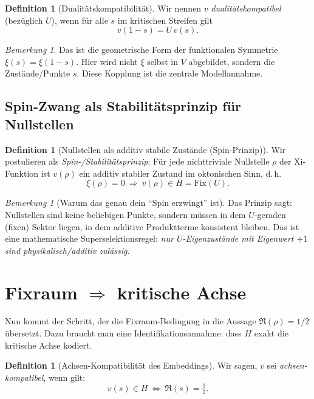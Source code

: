 \documentclass[11pt,a4paper]{article}
\theoremstyle{definition}
\newtheorem{definition}[satz]{Definition}
\theoremstyle{remark}
\newtheorem{bemerkung}[satz]{Bemerkung}
\begin{document}
	\begin{definition}[Dualitätskompatibilität]
		Wir nennen $v$ \emph{dualitätskompatibel} (bezüglich $U$), wenn für alle $s$ im kritischen
		Streifen gilt
		\[
		\boxed{\;\;v(1-s)=U\,v(s).\;\;}
		\]
	\end{definition}
	
	\begin{bemerkung}
		Das ist die geometrische Form der funktionalen Symmetrie $\xi(s)=\xi(1-s)$.
		Hier wird nicht $\xi$ selbst in $V$ abgebildet, sondern die Zustände/Punkte $s$.
		Diese Kopplung ist die zentrale Modellannahme.
	\end{bemerkung}
	
	\subsection{Spin-Zwang als Stabilitätsprinzip für Nullstellen}
	\begin{definition}[Nullstellen als additiv stabile Zustände (Spin-Prinzip)]
		Wir postulieren als \emph{Spin-/Stabilitätsprinzip}:
		Für jede nichttriviale Nullstelle $\rho$ der Xi-Funktion ist $v(\rho)$ ein additiv stabiler
		Zustand im oktonischen Sinn, d.\,h.
		\[
		\boxed{\;\;\xi(\rho)=0\ \Longrightarrow\ v(\rho)\in H=\mathrm{Fix}(U).\;\;}
		\]
	\end{definition}
	
	\begin{bemerkung}[Warum das genau dein ``Spin erzwingt'' ist]
		Das Prinzip sagt: Nullstellen sind keine beliebigen Punkte, sondern müssen in dem
		$U$-geraden (fixen) Sektor liegen, in dem additive Produktterme konsistent bleiben.
		Das ist eine mathematische Superselektionsregel:
		\emph{nur $U$-Eigenzustände mit Eigenwert $+1$ sind physikalisch/additiv zulässig.}
	\end{bemerkung}
	
	\section{Fixraum $\Rightarrow$ kritische Achse}
	Nun kommt der Schritt, der die Fixraum-Bedingung in die Aussage $\Re(\rho)=1/2$ übersetzt.
	Dazu braucht man eine Identifikationsannahme: dass $H$ exakt die kritische Achse kodiert.
	
	\begin{definition}[Achsen-Kompatibilität des Embeddings]
		Wir sagen, $v$ sei \emph{achsen-kompatibel}, wenn gilt:
		\[
		\boxed{\;\;v(s)\in H\ \Longleftrightarrow\ \Re(s)=\tfrac12.\;\;}
		\]
	\end{definition}
	
\end{document}
